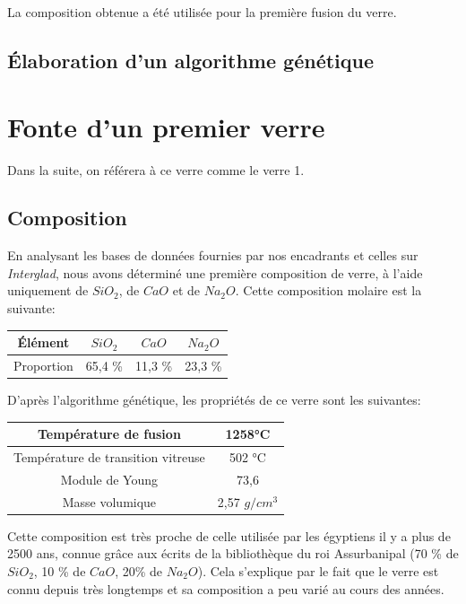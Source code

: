 \documentclass{article}
\begin{document}
La composition obtenue a été utilisée pour la première fusion du verre.

\subsection{Élaboration d'un algorithme génétique}

\section{Fonte d'un premier verre}

Dans la suite, on référera à ce verre comme le verre 1.
\subsection{Composition}

En analysant les bases de données fournies par nos encadrants et celles sur \textit{Interglad}, nous avons déterminé une première composition de verre, à l'aide uniquement de $SiO_2$, de $CaO$ et de $Na_2O$. Cette composition molaire est la suivante:

\begin{table}[ht]
\centering
\begin{tabular}{|c|c|c|c|}
    \hline
    Élément &  $SiO_2$ & $CaO$ & $Na_2O$ \\
    \hline
    Proportion & 65,4 \% & 11,3 \% & 23,3 \% \\
    \hline
    \end{tabular} 
\end{table}

D'après l'algorithme génétique, les propriétés de ce verre sont les suivantes:

\begin{table}[ht]
\centering
\begin{tabular}{|c|c|}
    \hline
    Température de fusion & 1258°C \\
    \hline
    Température de transition vitreuse & 502 °C \\
    \hline
    Module de Young & 73,6 \\
    \hline
    Masse volumique & 2,57 $g/cm^{3}$ \\
    \hline
    \end{tabular}
\end{table}

Cette composition est très proche de celle utilisée par les égyptiens il y a plus de 2500 ans, connue grâce aux écrits de la bibliothèque du roi Assurbanipal  \cite{Horst} (70 \% de $SiO_2$, 10 \% de $CaO$, 20\% de $Na_2O$). Cela s'explique par le fait que le verre est connu depuis très longtemps et sa composition a peu varié au cours des années. 
\end{document}
